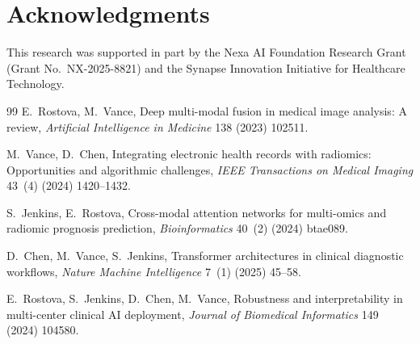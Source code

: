 \documentclass[final,3p,times]{elsarticle}
\begin{document}
\section*{Acknowledgments}
This research was supported in part by the Nexa AI Foundation Research Grant (Grant No.~NX-2025-8821) and the Synapse Innovation Initiative for Healthcare Technology.

\begin{thebibliography}{99}
E.~Rostova, M.~Vance, Deep multi-modal fusion in medical image analysis: A review, \textit{Artificial Intelligence in Medicine} 138 (2023) 102511.

M.~Vance, D.~Chen, Integrating electronic health records with radiomics: Opportunities and algorithmic challenges, \textit{IEEE Transactions on Medical Imaging} 43~(4) (2024) 1420--1432.

S.~Jenkins, E.~Rostova, Cross-modal attention networks for multi-omics and radiomic prognosis prediction, \textit{Bioinformatics} 40~(2) (2024) btae089.

D.~Chen, M.~Vance, S.~Jenkins, Transformer architectures in clinical diagnostic workflows, \textit{Nature Machine Intelligence} 7~(1) (2025) 45--58.

E.~Rostova, S.~Jenkins, D.~Chen, M.~Vance, Robustness and interpretability in multi-center clinical AI deployment, \textit{Journal of Biomedical Informatics} 149 (2024) 104580.
\end{thebibliography}
\end{document}
